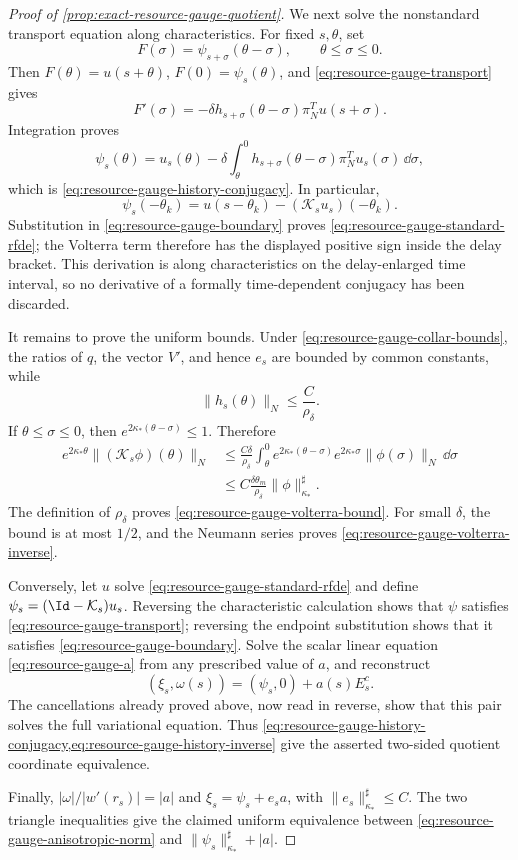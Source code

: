 \begin{proof}[Proof of \cref{prop:exact-resource-gauge-quotient}]
We next solve the nonstandard transport equation along characteristics.
For fixed \(s,\theta\), set
\[
 F(\sigma)=\psi_{s+\sigma}(\theta-\sigma),
 \qquad \theta\le\sigma\le0.
\]
Then \(F(\theta)=u(s+\theta)\), \(F(0)=\psi_s(\theta)\), and
\cref{eq:resource-gauge-transport} gives
\[
 F'(\sigma)
 =-\delta h_{s+\sigma}(\theta-\sigma)
       \pi_N^Tu(s+\sigma).
\]
Integration proves
\[
 \psi_s(\theta)=u_s(\theta)
 -\delta\int_\theta^0h_{s+\sigma}(\theta-\sigma)
        \pi_N^Tu_s(\sigma)\,\dd\sigma,
\]
which is \cref{eq:resource-gauge-history-conjugacy}.  In particular,
\[
 \psi_s(-\theta_k)
 =u(s-\theta_k)-(\mathcal K_su_s)(-\theta_k).
\]
Substitution in \cref{eq:resource-gauge-boundary} proves
\cref{eq:resource-gauge-standard-rfde}; the Volterra term therefore has the
displayed positive sign inside the delay bracket.  This derivation is along
characteristics on the delay-enlarged time interval, so no derivative of a
formally time-dependent conjugacy has been discarded.

It remains to prove the uniform bounds.  Under
\cref{eq:resource-gauge-collar-bounds}, the ratios of \(q\), the vector
\(V'\), and hence \(e_s\) are bounded by common constants, while
\[
 \|h_s(\theta)\|_N\le\frac{C}{\rho_\delta}.
\]
If \(\theta\le\sigma\le0\), then
\(e^{2\kappa_*(\theta-\sigma)}\le1\).  Therefore
\begin{align*}
 e^{2\kappa_*\theta}\|(\mathcal K_s\phi)(\theta)\|_N
 &\le\frac{C\delta}{\rho_\delta}
   \int_\theta^0
      e^{2\kappa_*(\theta-\sigma)}
      e^{2\kappa_*\sigma}\|\phi(\sigma)\|_N\,\dd\sigma\\
 &\le C\frac{\delta\theta_m}{\rho_\delta}
       \|\phi\|^\sharp_{\kappa_*}.
\end{align*}
The definition of \(\rho_\delta\) proves
\cref{eq:resource-gauge-volterra-bound}.  For small \(\delta\), the bound is
at most \(1/2\), and the Neumann series proves
\cref{eq:resource-gauge-volterra-inverse}.

Conversely, let \(u\) solve
\cref{eq:resource-gauge-standard-rfde} and define
\(\psi_s=(\Id-\mathcal K_s)u_s\).  Reversing the characteristic calculation
shows that \(\psi\) satisfies
\cref{eq:resource-gauge-transport}; reversing the endpoint substitution
shows that it satisfies \cref{eq:resource-gauge-boundary}.  Solve the scalar
linear equation \cref{eq:resource-gauge-a} from any prescribed value of
\(a\), and reconstruct
\[
 (\xi_s,\omega(s))=(\psi_s,0)+a(s)E_s^c.
\]
The cancellations already proved above, now read in reverse, show that this
pair solves the full variational equation.  Thus
\cref{eq:resource-gauge-history-conjugacy,eq:resource-gauge-history-inverse}
give the asserted two-sided quotient coordinate equivalence.

Finally, \(|\omega|/|w'(r_s)|=|a|\) and
\(\xi_s=\psi_s+e_sa\), with \(\|e_s\|^\sharp_{\kappa_*}\le C\).
The two triangle inequalities give the claimed uniform equivalence between
\cref{eq:resource-gauge-anisotropic-norm} and
\(\|\psi_s\|^\sharp_{\kappa_*}+|a|\).
\end{proof}

